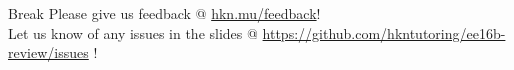 \documentclass{beamer}
\begin{document}






\begin{frame}{Break}
\Large{Please give us feedback @ \url{hkn.mu/feedback}!\\\vspace{2em}Let us know of any issues in the slides @ \url{https://github.com/hkntutoring/ee16b-review/issues} }!
\end{frame}
\end{document}
